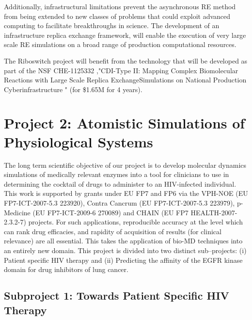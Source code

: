 \documentclass[a4paper,11pt]{article}
\begin{document}
Additionally, infrastructural limitations prevent the asynchronous RE method from being extended to new classes of problems that could exploit advanced computing to facilitate breakthroughs in science. The development of an infrastructure replica exchange framework, will enable the execution of very large scale RE simulations on a broad range of production computational resources.

The Riboswitch project will benefit from the technology that will be developed as part of the NSF CHE-1125332 ,"CDI-Type II: Mapping Complex Biomolecular Reactions with Large Scale Replica ExchangeSimulations on National Production Cyberinfrastructure " (for \$1.65M for 4 years).

\section{Project 2: Atomistic Simulations of Physiological Systems}

The long term scientific objective of our project is to develop molecular dynamics simulations of 
medically relevant enzymes into a tool for clinicians to use in determining the cocktail of drugs to 
administer to an HIV-infected individual. This work is supported by grants under EU FP7 and FP6 
via the VPH-NOE (EU FP7-ICT-2007-5.3 223920), Contra Cancrum (EU FP7-ICT-2007-5.3 223979), 
p-Medicine (EU FP7-ICT-2009-6 270089) and CHAIN (EU FP7 HEALTH-2007-2.3.2-7) projects. For such 
applications, reproducible accuracy at the level which can rank drug efficacies, and rapidity 
of acquisition of results (for clinical relevance) are all essential. This takes the application 
of bio-MD techniques into an entirely new domain. This project is divided into two distinct sub--projects:
(i) Patient specific HIV therapy and (ii) Predicting the affinity of the EGFR kinase domain for drug inhibitors of lung cancer.

\subsection{Subproject 1: Towards Patient Specific HIV Therapy}
\end{document}
